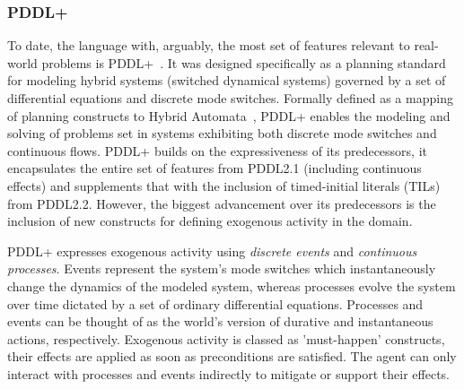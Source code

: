\subsubsection{PDDL+}

To date, the language with, arguably, the most set of features relevant to real-world problems is PDDL+~\cite{fox2006modelling}. It was designed specifically as a planning standard for modeling hybrid systems (switched dynamical systems) governed by a set of differential equations and discrete mode switches. Formally defined as a mapping of planning constructs to Hybrid Automata~\cite{henzinger2000theory}, PDDL+ enables the modeling and solving of problems set in systems exhibiting both discrete mode switches and continuous flows. PDDL+ builds on the expressiveness of its predecessors, it encapsulates the entire set of features from PDDL2.1 (including continuous effects) and supplements that with the inclusion of timed-initial literals (TILs) from PDDL2.2. However, the biggest advancement over its predecessors is the inclusion of new constructs for defining exogenous activity in the domain.  

PDDL+ expresses exogenous activity using \textit{discrete events} and \textit{continuous processes}. Events represent the system's mode switches which instantaneously change the dynamics of the modeled system, whereas processes evolve the system over time dictated by a set of ordinary differential equations. Processes and events can be thought of as the world's version of durative and instantaneous actions, respectively. Exogenous activity is classed as 'must-happen' constructs, their effects are applied as soon as preconditions are satisfied. The agent can only interact with processes and events indirectly to mitigate or support their effects.


